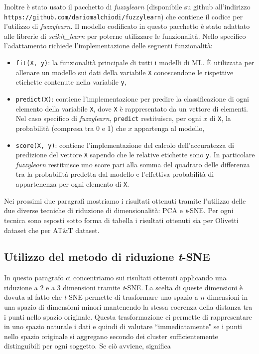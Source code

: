 \documentclass[12pt,italian]{report}
\begin{document}
Inoltre è stato usato il pacchetto di \emph{fuzzylearn} (disponibile su github all'indirizzo \texttt{https://github.com/dariomalchiodi/fuzzylearn}) che contiene il codice per l'utilizzo di \emph{fuzzylearn}. Il modello codificato in questo pacchetto è stato adattato alle librerie di \emph{scikit\_learn} per poterne utilizzare le funzionalità. Nello specifico l'adattamento richiede l'implementazione delle seguenti funzionalità:
\begin{itemize}
\item{\texttt{fit(X, y)}: la funzionalità principale di tutti i modelli di ML. È utilizzata per allenare un modello sui dati della variabile \texttt{X} conoscendone le rispettive etichette contenute nella variabile \texttt{y},}
\item{\texttt{predict(X)}: contiene l'implementazione per predire la classificazione di ogni elemento della variabile \texttt{X}, dove \texttt{X} è rappresentato da un vettore di elementi. Nel caso specifico di \emph{fuzzylearn}, \texttt{predict} restituisce, per ogni $x$ di \texttt{X}, la probabilità (compresa tra 0 e 1) che $x$ appartenga al modello,}
\item{\texttt{score(X, y)}: contiene l'implementazione del calcolo dell'accuratezza di predizione del vettore \texttt{X} sapendo che le relative etichette sono \texttt{y}. In particolare \emph{fuzzylearn} restituisce uno score pari alla somma del quadrato delle differenza tra la probabilità predetta dal modello e l'effettiva probabilità di appartenenza per ogni elemento di \texttt{X}.}
\end{itemize}
Nei prossimi due paragrafi mostriamo i risultati ottenuti tramite l'utilizzo delle due diverse tecniche di riduzione di dimensionalità: PCA e \emph{t}-SNE. Per ogni tecnica sono esposti sotto forma di tabella i risultati ottenuti sia per Olivetti dataset che per AT\&T dataset. 

\subsection{Utilizzo del metodo di riduzione \emph{t}-SNE}
In questo paragrafo ci concentriamo sui risultati ottenuti applicando una riduzione a 2 e a 3 dimensioni tramite \emph{t}-SNE. La scelta di queste dimensioni è dovuta al fatto che \emph{t}-SNE permette di trasformare uno spazio a $ n $ dimensioni in una spazio di dimensioni minori mantenendo la stessa coerenza della distanza tra i punti nello spazio originale. Questa trasformazione ci permette di rappresentare in uno spazio naturale i dati e quindi di valutare ``immediatamente" se i punti nello spazio originale si aggregano secondo dei cluster sufficientemente distinguibili per ogni soggetto. Se ciò avviene, significa 
\end{document}
